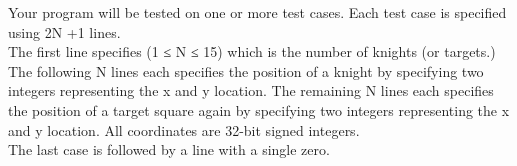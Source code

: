 Your program will be tested on one or more test cases. Each test case is specified using 2N +1 lines.
\\The first line specifies (1 ≤ N ≤ 15) which is the number of knights (or targets.) The following N lines each specifies the position of a knight by specifying two integers representing the x and y location. The remaining N lines each specifies the position of a target square again by specifying two integers representing the x and y location. All coordinates are 32-bit signed integers.
\\The last case is followed by a line with a single zero.

\